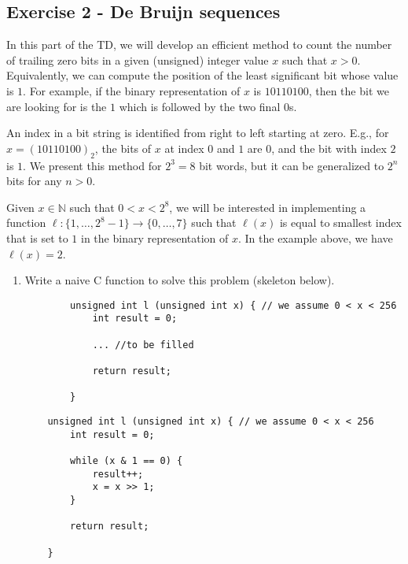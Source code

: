 \documentclass[11pt]{article}
\begin{document}
\subsection*{Exercise 2 -  De Bruijn sequences}

In this part of the TD, we will develop an efficient method to count the number of trailing
zero bits in a given (unsigned) integer value $x$ such that $x > 0$. Equivalently, we can compute
the position of the least significant bit whose value is $1$. For example, if the binary representation of $x$ is $10110100$, then the bit we are looking for is the $1$ which is followed by the two final $0$s.

An index in a bit string is identified from right to left starting at zero. E.g., for $x =
(10110100)_2$, the bits of $x$ at index $0$ and $1$ are $0$, and the bit with index $2$ is $1$. We present this method for $2^3=8$ bit words, but it can be generalized to $2^n$ bits for any $n>0$.

Given $x \in \mathbb{N}$ such that $0 < x < 2^8$, we will be interested in implementing a function
$\ell : \{1, \ldots, 2^8-1\} \rightarrow \{0, \ldots, 7\}$ such that $\ell(x)$ is equal to smallest index that is set to $1$ in
the binary representation of $x$. In the example above, we have $\ell(x) = 2$.

\begin{enumerate}
	\item Write a naive C function to solve this problem (skeleton below). 
	\begin{verbatim}
		unsigned int l (unsigned int x) { // we assume 0 < x < 256
			int result = 0;
			
			... //to be filled
			
			return result;
			
		}
	\end{verbatim}
	\begin{solution}
\begin{verbatim}
	unsigned int l (unsigned int x) { // we assume 0 < x < 256
		int result = 0;
		
		while (x & 1 == 0) {
			result++;
			x = x >> 1;
		}
		
		return result;
		
	}
\end{verbatim}
\end{solution}
\end{enumerate}
\end{document}
